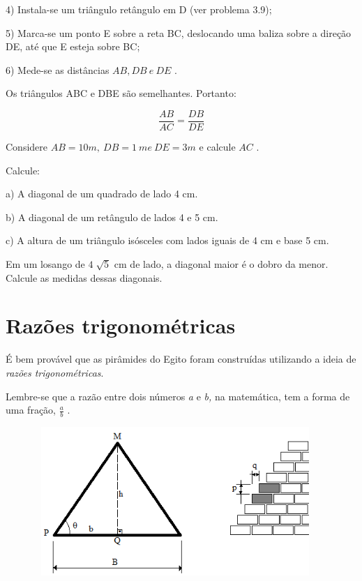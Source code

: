 \begin{exercicios}
4\degree) Instala-se um triângulo retângulo em D (ver problema 3.9);

5\degree) Marca-se um ponto E sobre a reta BC, deslocando uma baliza sobre a direção DE, até que E esteja sobre BC;

6\degree) Mede-se as distâncias  \( AB, DB~ e~ DE \) .

Os triângulos ABC e DBE são semelhantes. Portanto:

 \[ \frac{AB}{AC}=\frac{DB}{DE} \]

Considere  \( AB=10m,~ DB=1~m  e~ DE=3 m \)  e calcule  \( AC  \) .

\exitem{} Calcule:

a) A diagonal de um quadrado de lado 4 cm.

b) A diagonal de um retângulo de lados 4 e 5 cm.

c) A altura de um triângulo isósceles com lados iguais de 4 cm e base 5 cm.

\exitem{} Em um losango de  \( 4\sqrt[]{5} \)  cm de lado, a diagonal maior é o dobro da menor. Calcule as medidas dessas diagonais.
\end{exercicios}

\section{Razões trigonométricas}

É bem provável que as pirâmides do Egito foram construídas utilizando a ideia de \textit{razões trigonométricas}.

Lembre-se que a razão entre dois números \textit{a} e \textit{b,} na matemática, tem a forma de uma fração,   \( \frac{a}{b} \)  .

\begin{figure}[H]
    \begin{Center}
        \includegraphics[width=4.23in,height=2.22in]{capitulos/trigonometria_e_funcoes_trigonometricas/media/image20.png}
    \end{Center}
\end{figure}

